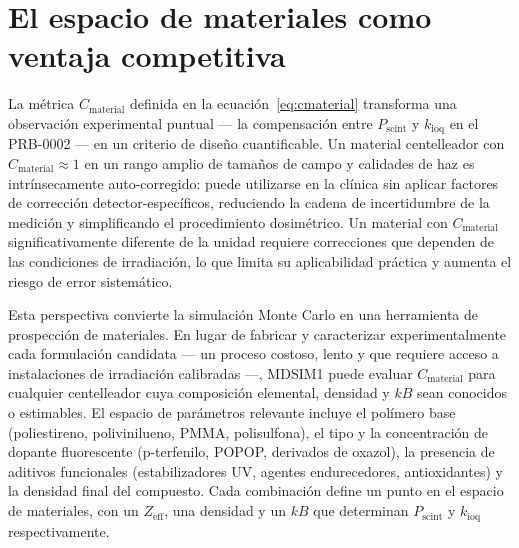 \documentclass[11pt,a4paper]{article}
\begin{document}

\newpage


\section{El espacio de materiales como ventaja competitiva}




La métrica $C_{\mathrm{material}}$ definida en la ecuación~\eqref{eq:cmaterial} transforma una observación experimental puntual --- la compensación entre $P_{\mathrm{scint}}$ y $k_{\mathrm{ioq}}$ en el PRB-0002 --- en un criterio de diseño cuantificable. Un material centelleador con $C_{\mathrm{material}} \approx 1$ en un rango amplio de tamaños de campo y calidades de haz es intrínsecamente auto-corregido: puede utilizarse en la clínica sin aplicar factores de corrección detector-específicos, reduciendo la cadena de incertidumbre de la medición y simplificando el procedimiento dosimétrico. Un material con $C_{\mathrm{material}}$ significativamente diferente de la unidad requiere correcciones que dependen de las condiciones de irradiación, lo que limita su aplicabilidad práctica y aumenta el riesgo de error sistemático.

Esta perspectiva convierte la simulación Monte Carlo en una herramienta de prospección de materiales. En lugar de fabricar y caracterizar experimentalmente cada formulación candidata --- un proceso costoso, lento y que requiere acceso a instalaciones de irradiación calibradas ---, MDSIM1 puede evaluar $C_{\mathrm{material}}$ para cualquier centelleador cuya composición elemental, densidad y $kB$ sean conocidos o estimables. El espacio de parámetros relevante incluye el polímero base (poliestireno, polivinilueno, PMMA, polisulfona), el tipo y la concentración de dopante fluorescente (p-terfenilo, POPOP, derivados de oxazol), la presencia de aditivos funcionales (estabilizadores UV, agentes endurecedores, antioxidantes) y la densidad final del compuesto. Cada combinación define un punto en el espacio de materiales, con un $Z_{\mathrm{eff}}$, una densidad y un $kB$ que determinan $P_{\mathrm{scint}}$ y $k_{\mathrm{ioq}}$ respectivamente.
\end{document}
